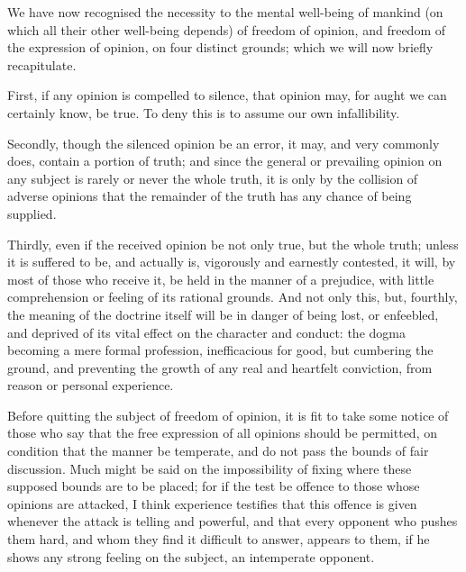 \documentclass[11pt,openany]{book}
\begin{document}
We have now recognised the necessity to the mental well-being of mankind (on which all their other well-being depends) of freedom of opinion, and freedom of the expression of opinion, on four distinct grounds; which we will now briefly recapitulate.

First, if any opinion is compelled to silence, that opinion may, for aught we can certainly know, be true. To deny this is to assume our own infallibility.

Secondly, though the silenced opinion be an error, it may, and very commonly does, contain a portion of truth; and since the general or prevailing opinion on any subject is rarely or never the whole truth, it is only by the collision of adverse opinions that the remainder of the truth has any chance of being supplied.

Thirdly, even if the received opinion be not only true, but the whole truth; unless it is suffered to be, and actually is, vigorously and earnestly contested, it will, by most of those who receive it, be held in the manner of a prejudice, with little comprehension or feeling of its rational grounds. And not only this, but, fourthly, the meaning of the doctrine itself will be in danger of being lost, or enfeebled, and deprived of its vital effect on the character and conduct: the dogma becoming a mere formal profession, inefficacious for good, but cumbering the ground, and preventing the growth of any real and heartfelt conviction, from reason or personal experience.

Before quitting the subject of freedom of opinion, it is fit to take some notice of those who say that the free expression of all opinions should be permitted, on condition that the manner be temperate, and do not pass the bounds of fair discussion. Much might be said on the impossibility of fixing where these supposed bounds are to be placed; for if the test be offence to those whose opinions are attacked, I think experience testifies that this offence is given whenever the attack is telling and powerful, and that every opponent who pushes them hard, and whom they find it difficult to answer, appears to them, if he shows any strong feeling on the subject, an intemperate opponent.
\end{document}
